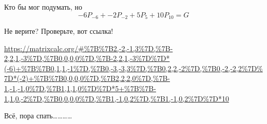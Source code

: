 \documentclass[12pt, a4paper]{article}
\begin{document}
    Кто бы мог подумать, но 
    \begin{equation}
        -6 P_{-6} + -2 P_{-2} + 5 P_{5} + 10 P_{10} = G
    \end{equation}


    Не верите? Проверьте, вот ссылка!

    \url{https://matrixcalc.org/#%7B%7B2,-2,-1,3%7D,%7B-2,2,1,-3%7D,%7B0,0,0,0%7D,%7B-2,2,1,-3%7D%7D*(-6)+%7B%7B0,1,1,-1%7D,%7B0,-3,-3,3%7D,%7B0,2,2,-2%7D,%7B0,-2,-2,2%7D%7D*(-2)+%7B%7B0,0,0,0%7D,%7B2,2,2,0%7D,%7B-1,-1,-1,0%7D,%7B1,1,1,0%7D%7D*5+%7B%7B-1,1,0,-2%7D,%7B0,0,0,0%7D,%7B1,-1,0,2%7D,%7B1,-1,0,2%7D%7D*10}

    Всё, пора спать…………
\end{document}
